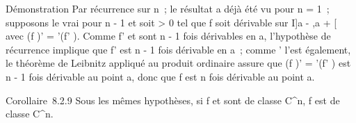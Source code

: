 Démonstration Par récurrence sur n~; le résultat a déjà été vu pour n =
1~; supposons le vrai pour n - 1 et soit \eta > 0 tel que f \cdot
\phi soit dérivable sur I\bigcap]a - \eta,a + \eta[ avec (f \cdot \phi)' = \phi'(f' \cdot \phi).
Comme f' et \phi sont n - 1 fois dérivables en a, l'hypothèse de récurrence
implique que f' \cdot \phi est n - 1 fois dérivable en a~; comme \phi' l'est
également, le théorème de Leibnitz appliqué au produit ordinaire assure
que (f \cdot \phi)' = \phi'(f' \cdot \phi) est n - 1 fois dérivable au point a, donc que
f \cdot \phi est n fois dérivable au point a.

Corollaire~8.2.9 Sous les mêmes hypothèses, si f et \phi sont de classe
C^n, f \cdot \phi est de classe C^n.

